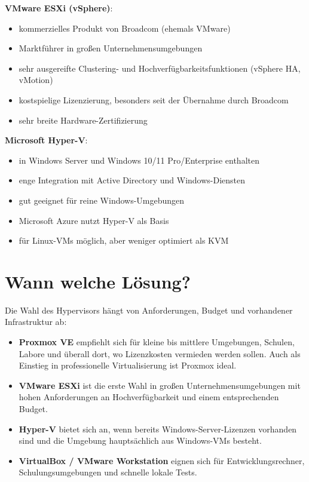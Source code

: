 \documentclass[11pt, oneside, numbers=noenddot]{scrbook}
\begin{document}
\textbf{VMware ESXi (vSphere)}:
\begin{itemize}
  \item kommerzielles Produkt von Broadcom (ehemals VMware)
  \item Marktführer in großen Unternehmensumgebungen
  \item sehr ausgereifte Clustering- und Hochverfügbarkeitsfunktionen (vSphere HA, vMotion)
  \item kostspielige Lizenzierung, besonders seit der Übernahme durch Broadcom
  \item sehr breite Hardware-Zertifizierung
\end{itemize}

\textbf{Microsoft Hyper-V}:
\begin{itemize}
  \item in Windows Server und Windows 10/11 Pro/Enterprise enthalten
  \item enge Integration mit Active Directory und Windows-Diensten
  \item gut geeignet für reine Windows-Umgebungen
  \item Microsoft Azure nutzt Hyper-V als Basis
  \item für Linux-VMs möglich, aber weniger optimiert als KVM
\end{itemize}

\section{Wann welche Lösung?}
Die Wahl des Hypervisors hängt von Anforderungen, Budget und vorhandener Infrastruktur ab:

\begin{itemize}
  \item \textbf{Proxmox VE} empfiehlt sich für kleine bis mittlere Umgebungen, Schulen, Labore und überall dort, wo Lizenzkosten vermieden werden sollen. Auch als Einstieg in professionelle Virtualisierung ist Proxmox ideal.
  \item \textbf{VMware ESXi} ist die erste Wahl in großen Unternehmensumgebungen mit hohen Anforderungen an Hochverfügbarkeit und einem entsprechenden Budget.
  \item \textbf{Hyper-V} bietet sich an, wenn bereits Windows-Server-Lizenzen vorhanden sind und die Umgebung hauptsächlich aus Windows-VMs besteht.
  \item \textbf{VirtualBox / VMware Workstation} eignen sich für Entwicklungsrechner, Schulungsumgebungen und schnelle lokale Tests.
\end{itemize}
\end{document}
